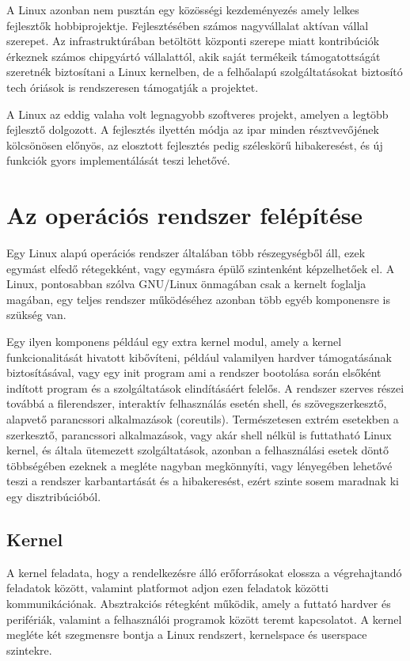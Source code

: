 A Linux azonban nem pusztán egy közösségi kezdeményezés amely lelkes fejlesztők
hobbiprojektje. Fejlesztésében számos nagyvállalat aktívan vállal szerepet. Az
infrastruktúrában betöltött központi szerepe miatt kontribúciók érkeznek számos
chipgyártó vállalattól, akik saját termékeik támogatottságát szeretnék
biztosítani a Linux kernelben, de a felhőalapú szolgáltatásokat biztosító tech
óriások is rendszeresen támogatják a projektet.

A Linux az eddig valaha volt legnagyobb szoftveres projekt, amelyen a legtöbb
fejlesztő dolgozott. A fejlesztés ilyettén módja az ipar minden résztvevőjének
kölcsönösen előnyös, az elosztott fejlesztés pedig széleskörű hibakeresést, és új
funkciók gyors implementálását teszi lehetővé.

\section{Az operációs rendszer felépítése}

Egy Linux alapú operációs rendszer általában több részegységből áll, ezek egymást
elfedő rétegekként, vagy egymásra épülő szintenként képzelhetőek el. A Linux,
pontosabban szólva GNU/Linux önmagában csak a kernelt foglalja magában, egy
teljes rendszer működéséhez azonban több egyéb komponensre is szükség van.

Egy ilyen komponens például egy extra kernel modul, amely a kernel
funkcionalitását hivatott kibővíteni, például valamilyen hardver támogatásának
biztosításával, vagy egy init program ami a rendszer bootolása során elsőként
indított program és a szolgáltatások elindításáért felelős. A rendszer szerves
részei továbbá a filerendszer, interaktív felhasználás esetén shell, és
szövegszerkesztő, alapvető parancssori alkalmazások (coreutils). Természetesen
extrém esetekben a szerkesztő, parancssori alkalmazások, vagy akár shell nélkül
is futtatható Linux kernel, és általa ütemezett szolgáltatások, azonban a
felhasználási esetek döntő többségében ezeknek a megléte nagyban megkönnyíti,
vagy lényegében lehetővé teszi a rendszer karbantartását és a hibakeresést, ezért
szinte sosem maradnak ki egy disztribúcióból.

\subsection{Kernel}
 
A kernel feladata, hogy a rendelkezésre álló erőforrásokat elossza a
végrehajtandó feladatok között, valamint platformot adjon ezen feladatok közötti
kommunikációnak. Absztrakciós rétegként működik, amely a futtató hardver és
perifériák, valamint a felhasználói programok között teremt kapcsolatot. A kernel
megléte két szegmensre bontja a Linux rendszert, kernelspace és userspace
szintekre.

